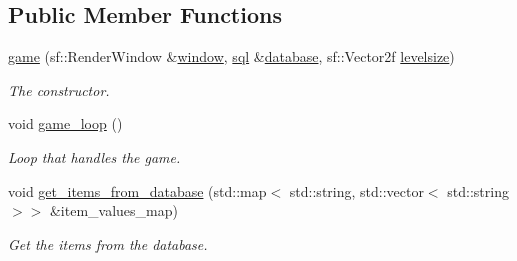 \subsection*{Public Member Functions}
\begin{DoxyCompactItemize}
\item 
\hyperlink{classgame_a46eaf7a077e7f3ff0b5e229142358f00}{game} (sf\+::\+Render\+Window \&\hyperlink{classgame_af7435cad08a8114c7598bc99f5b6496e}{window}, \hyperlink{classsql}{sql} \&\hyperlink{classgame_aa6c2206b4735cd2c90f934384c350e0a}{database}, sf\+::\+Vector2f \hyperlink{classgame_abccd2ff11b53d33fde0ee8ab50c29972}{levelsize})
\begin{DoxyCompactList}\small\item\em The constructor. \end{DoxyCompactList}\item 
void \hyperlink{classgame_a2b80a1fbc6d723e78d3c86d2f8ff24d4}{game\+\_\+loop} ()
\begin{DoxyCompactList}\small\item\em Loop that handles the game. \end{DoxyCompactList}\item 
void \hyperlink{classgame_a0eb06f984d04128ba7fba6fcca04bda3}{get\+\_\+items\+\_\+from\+\_\+database} (std\+::map$<$ std\+::string, std\+::vector$<$ std\+::string $>$$>$ \&item\+\_\+values\+\_\+map)
\begin{DoxyCompactList}\small\item\em Get the items from the database. \end{DoxyCompactList}\end{DoxyCompactItemize}
